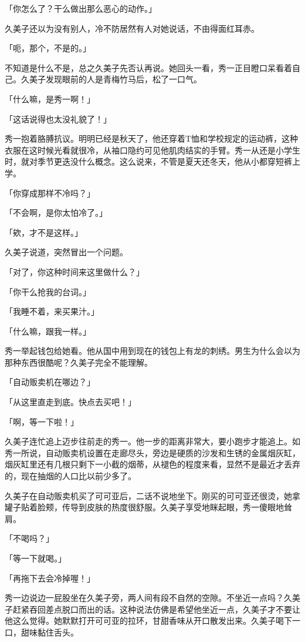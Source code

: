 \documentclass[UTF8]{ctexart}
\begin{document}
    「你怎么了？干么做出那么恶心的动作。」 

    久美子还以为没有别人，冷不防居然有人对她说话，不由得面红耳赤。 

    「呃，那个，不是的。」 

    不知道是什么不是，总之久美子先否认再说。她回头一看，秀一正目瞪口呆看着自己。久美子发现眼前的人是青梅竹马后，松了一口气。 

    「什么嘛，是秀一啊！」 

    「这话说得也太没礼貌了！」 

    秀一抱着胳膊抗议。明明已经是秋天了，他还穿着T恤和学校规定的运动裤，这种衣服在这时候光看就很冷，从袖口隐约可见他肌肉结实的手臂。秀一从还是小学生时，就对季节更迭没什么概念。这么说来，不管是夏天还冬天，他从小都穿短裤上学。 

    「你穿成那样不冷吗？」 

    「不会啊，是你太怕冷了。」 

    「欸，才不是这样。」 

    久美子说道，突然冒出一个问题。 

    「对了，你这种时间来这里做什么？」 

    「你干么抢我的台词。」 

    「我睡不着，来买果汁。」 

    「什么嘛，跟我一样。」 

    秀一举起钱包给她看。他从国中用到现在的钱包上有龙的刺绣。男生为什么会以为那种东西很酷呢？久美子完全不能理解。 

    「自动贩卖机在哪边？」 

    「从这里直走到底。快点去买吧！」 

    「啊，等一下啦！」 

    久美子连忙追上迈步往前走的秀一。他一步的距离非常大，要小跑步才能追上。如秀一所说，自动贩卖机设置在走廊尽头，旁边是硬质的沙发和生锈的金属烟灰缸，烟灰缸里还有几根只剩下一小截的烟蒂，从褪色的程度来看，显然不是最近才丢弃的，现在抽烟的人口比以前少多了。 

    久美子在自动贩卖机买了可可亚后，二话不说地坐下。刚买的可可亚还很烫，她拿罐子贴着脸颊，传导到皮肤的热度很舒服。久美子享受地眯起眼，秀一傻眼地耸肩。 

    「不喝吗？」 

    「等一下就喝。」 

    「再拖下去会冷掉喔！」 

    秀一边说边一屁股坐在久美子旁，两人间有段不自然的空隙。不坐近一点吗？久美子赶紧吞回差点脱口而出的话。这种说法仿佛是希望他坐近一点，久美子才不要让他这么觉得。她默默打开可可亚的拉环，甘甜香味从开口散发出来。久美子喝下一口，甜味黏住舌头。 
\end{document}
